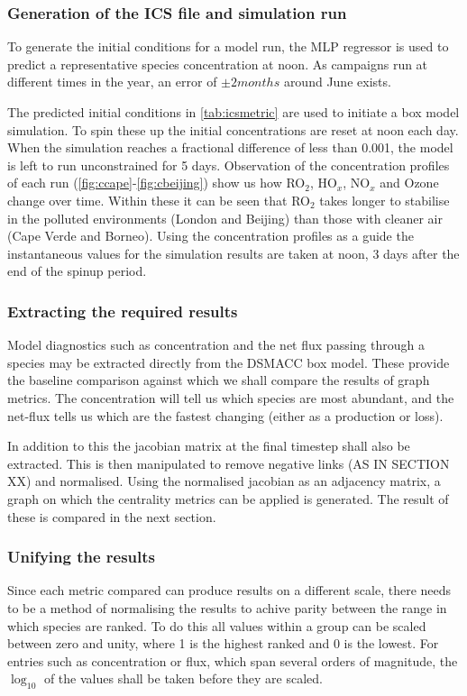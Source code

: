 \subsubsection{Generation of the ICS file and simulation run}

To generate the initial conditions for a model run, the MLP regressor is used to predict a representative species concentration at noon. As campaigns run at different times in the year, an error of $\pm 2 months$ around June exists. 

The predicted initial conditions in \autoref{tab:icsmetric} are used to initiate a box model simulation. 
To spin these up the initial concentrations are reset at noon each day. When the simulation reaches a fractional difference of less than 0.001, the model is left to run unconstrained for 5 days. Observation of the concentration profiles of each run (\autoref{fig:ccape}-\ref{fig:cbeijing}) show us how RO$_2$, HO$_x$, NO$_x$ and Ozone change over time. Within these it can be seen that RO$_2$ takes longer to stabilise in the polluted environments (London and Beijing) than those with cleaner air (Cape Verde and Borneo). Using the concentration profiles as a guide the instantaneous values for the simulation results are taken at noon, 3 days after the end of the spinup period. 

\subsubsection{Extracting the required results}
Model diagnostics such as concentration and the net flux passing through a species may be extracted directly from the DSMACC box model. These provide the baseline comparison against which we shall compare the results of graph metrics. The concentration will tell us which species are most abundant, and the net-flux tells us which are the fastest changing (either as a production or loss). 

In addition to this the jacobian matrix at the final timestep shall also be extracted. This is then manipulated to remove negative links (AS IN SECTION XX) and normalised. Using the normalised jacobian as an adjacency matrix, a graph on which the centrality metrics can be applied is generated. The result of these is compared in the next section.

\subsubsection{Unifying the results}
Since each metric compared can produce results on a different scale, there needs to be a method of normalising the results to achive parity between the range in which species are ranked. To do this all values within a group can be scaled between zero and unity, where 1 is the highest ranked and 0 is the lowest. For entries such as concentration or flux, which span several orders of magnitude, the $\log_{10}$ of the values shall be taken before they are scaled. 

